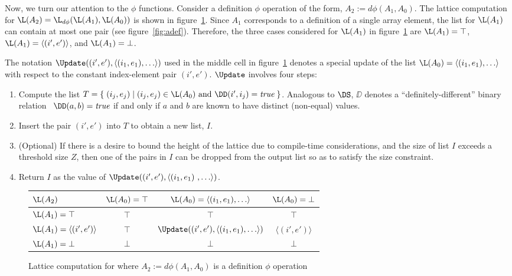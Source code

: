 Now, we turn our attention to the $\phi$ functions. 
Consider a
definition $\phi$ operation
of the form, $A_2 := d\phi(A_1, A_0)$.  
The lattice computation for $\L(A_2) = \L_{d\phi}(\L(A_1), \L(A_0))$
is shown in figure~\ref{fig:dphi}.  Since $A_1$ corresponds to a definition
of a single array element, the list for $\L(A_1)$ can contain
at most one pair (see figure~\ref{fig:adef}).
Therefore, the three cases considered for $\L(A_1)$ in figure~\ref{fig:dphi}
are $\L(A_1) = \top$, $\L(A_1) = \langle(i',e')\rangle$, and
 $\L(A_1) = \bot$.

The notation 
$\Update((i',e'),\langle (i_1,e_1), \ldots \rangle)$
used in the middle cell in 
figure~\ref{fig:dphi} denotes a special update of 
the list $\L(A_0) = \langle (i_1,e_1), \ldots \rangle$
with respect to the constant
index-element pair $(i',e')$. $\Update$ involves four steps\label{def:update}:
\begin{enumerate}
\item Compute the list $T = \{\;(i_j,e_j)\;|\;(i_j,e_j)\in\L(A_0)
\mbox{~and~}\DD(i',i_j)=\mbox{\it true}\;\}$.  
Analogous to $\DS$, $\DD$ denotes a ``definitely-different'' binary
relation \ie\ $\DD(a,b) = \mbox{\it true}$ if and only if $a$ and
$b$ are known to have distinct (non-equal) values.

\item Insert the pair $(i',e')$ into $T$ to obtain a new list, $I$.
\item (Optional) If there is a desire to bound the height of the lattice due to
  compile-time considerations, and the size of list
$I$ exceeds a threshold size $Z$, then one of the pairs in $I$ can be
dropped from the output list so as to satisfy the size constraint.  
\item Return $I$ as the value of 
$\Update((i',e'),\langle (i_1,e_1)\
, \ldots \rangle)$.
\end{enumerate}

\begin{figure}%
\begin{center}
\begin{tabular}{|l||c|c|c|}
\hline
$\L(A_2)$ & $\L(A_0) = \top$ & $\L(A_0) = \langle (i_1,e_1), \ldots \rangle $ & $\L(A_0) = \bot$ \\
\hline \hline
$\L(A_1) = \top$ & $\top$ & $\top$ & $\top$ \\
\hline
$\L(A_1) = \langle(i',e')\rangle$ & $\top$ & $\Update((i',e'),\langle (i_1,e_1), \ldots \rangle)$ & $\langle(i',e')\rangle$ \\
\hline
$\L(A_1) = \bot$ & $\bot$ & $\bot$ & $\bot$ \\
\hline
\end{tabular}
\end{center}
\caption{Lattice computation for 
where $A_2 := d\phi(A_1, A_0)$ is
a definition $\phi$ operation}
\label{fig:dphi}
\end{figure}


